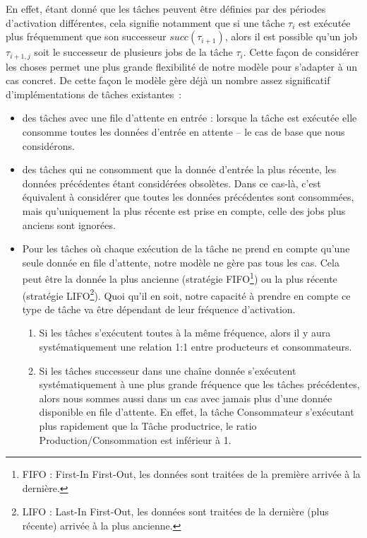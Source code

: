 \documentclass[french, a4paper, 11pt, twoside, pdftex]{StyleThese}
\begin{document}
  		En effet, étant donné que les tâches peuvent être définies par des périodes d'activation différentes, cela signifie notamment que si une tâche $\tau_i$ est exécutée plus fréquemment que son successeur $succ(\tau_{i+1})$, alors il est possible  qu'un job $\tau_{i+1,j}$ soit le successeur de plusieurs jobs de la tâche $\tau_{i}$. Cette façon de considérer les choses permet une plus grande flexibilité de notre modèle pour s'adapter à un cas concret. De cette façon le modèle gère déjà un nombre assez significatif d'implémentations de tâches existantes~:
	\begin{itemize}
		\item   		des tâches avec une file d'attente en entrée : lorsque la tâche est exécutée elle consomme toutes les données d'entrée en attente -- le cas de base que nous considérons.
		\item   		des tâches qui ne consomment que la donnée d'entrée la plus récente, les données précédentes étant considérées obsolètes. Dans ce cas-là, c'est équivalent à considérer que toutes les données précédentes sont consommées, mais qu'uniquement la plus récente est prise en compte, celle des jobs plus anciens sont ignorées.
		\item   		Pour les tâches où chaque exécution de la tâche ne prend en compte qu'une seule donnée en file d'attente, notre modèle ne gère pas tous les cas. Cela peut être la donnée la plus ancienne (stratégie FIFO\footnote{FIFO : First-In First-Out, les données sont traitées de la première arrivée à la dernière.}) ou la plus récente (stratégie LIFO\footnote{LIFO : Last-In First-Out, les données sont traitées de la dernière (plus récente) arrivée à la plus ancienne.}). Quoi qu'il en soit, notre capacité à prendre en compte ce type de tâche va être dépendant de leur fréquence d'activation. 
		\begin{enumerate}\item Si les tâches s'exécutent toutes à la même fréquence, alors il y aura systématiquement une relation 1\string:1 entre producteurs et consommateurs.
		\item Si les tâches successeur dans une chaîne donnée s'exécutent systématiquement à une plus grande fréquence que les tâches précédentes, alors nous sommes aussi dans un cas avec jamais plus d'une donnée disponible en file d'attente. En effet, la tâche Consommateur s'exécutant plus rapidement que la Tâche productrice, le ratio Production/Consommation est inférieur à 1.
		

\end{enumerate}
\end{itemize}
\end{document}
